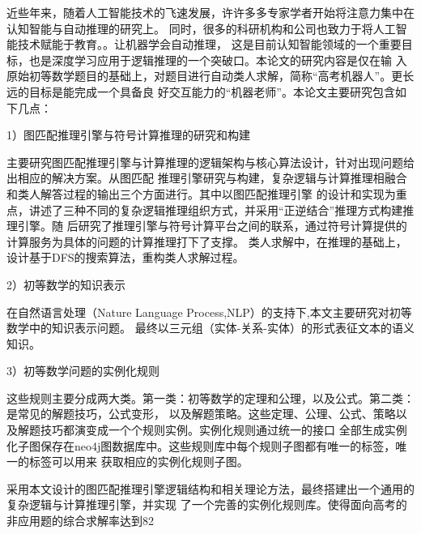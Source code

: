 \documentclass{standalone}
\begin{document}
	
\begin{chineseabstract}
近些年来，随着人工智能技术的飞速发展，许许多多专家学者开始将注意力集中在认知智能与自动推理的研究上。
同时，很多的科研机构和公司也致力于将人工智能技术赋能于教育。。让机器学会自动推理，
这是目前认知智能领域的一个重要目标，也是深度学习应用于逻辑推理的一个突破口。本论文的研究内容是仅在输
入原始初等数学题目的基础上，对题目进行自动类人求解，简称“高考机器人”。更长远的目标是能完成一个具备良
好交互能力的“机器老师”。本论文主要研究包含如下几点：

1）图匹配推理引擎与符号计算推理的研究和构建

主要研究图匹配推理引擎与计算推理的逻辑架构与核心算法设计，针对出现问题给出相应的解决方案。从图匹配
推理引擎研究与构建，复杂逻辑与计算推理相融合和类人解答过程的输出三个方面进行。其中以图匹配推理引擎
的设计和实现为重点，讲述了三种不同的复杂逻辑推理组织方式，并采用“正逆结合”推理方式构建推理引擎。随
后研究了推理引擎与符号计算平台之间的联系，通过符号计算提供的计算服务为具体的问题的计算推理打下了支撑。
类人求解中，在推理的基础上，设计基于DFS的搜索算法，重构类人求解过程。

2）初等数学的知识表示

在自然语言处理（Nature Language Process,NLP）的支持下,本文主要研究对初等数学中的知识表示问题。
最终以三元组（实体-关系-实体）的形式表征文本的语义知识。

3）初等数学问题的实例化规则

这些规则主要分成两大类。第一类：初等数学的定理和公理，以及公式。第二类：是常见的解题技巧，公式变形，
以及解题策略。这些定理、公理、公式、策略以及解题技巧都演变成一个个规则实例。实例化规则通过统一的接口
全部生成实例化子图保存在neo4j图数据库中。这些规则库中每个规则子图都有唯一的标签，唯一的标签可以用来
获取相应的实例化规则子图。

采用本文设计的图匹配推理引擎逻辑结构和相关理论方法，最终搭建出一个通用的复杂逻辑与计算推理引擎，并实现
了一个完善的实例化规则库。使得面向高考的非应用题的综合求解率达到82%


\end{chineseabstract}
\end{document}
